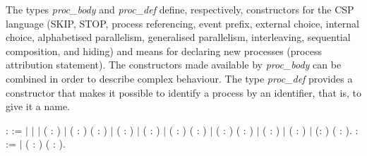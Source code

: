 The types \emph{proc\_body} and \emph{proc\_def} define, respectively, constructors for the CSP language (SKIP, STOP, process referencing, event prefix, external choice, internal choice, alphabetised parallelism, generalised parallelism, interleaving, sequential composition, and hiding) and means for declaring new processes (process attribution statement). The constructors made available by \emph{proc\_body} can be combined in order to describe complex behaviour. The type \emph{proc\_def} provides a constructor that makes it possible to identify a process by an identifier, that is, to give it a name.

\begin{coqdoccode}
	\coqdocnoindent
	  :  :=\coqdoceol
	\coqdocindent{1.00em}
	\ensuremath{|} \coqdoceol
	\coqdocindent{1.00em}
	\ensuremath{|} \coqdoceol
	\coqdocindent{1.00em}
	\ensuremath{|}  ( : )\coqdoceol
	\coqdocindent{1.00em}
	\ensuremath{|}  ( : ) ( : )\coqdoceol
	\coqdocindent{1.00em}
	\ensuremath{|}  (  : )\coqdoceol
	\coqdocindent{1.00em}
	\ensuremath{|}  (  : )\coqdoceol
	\coqdocindent{1.00em}
	\ensuremath{|}  (  : ) (  : )\coqdoceol
	\coqdocindent{1.00em}
	\ensuremath{|}  (  : ) ( : )\coqdoceol
	\coqdocindent{1.00em}
	\ensuremath{|}  (  : )\coqdoceol
	\coqdocindent{1.00em}
	\ensuremath{|}  (  : )\coqdoceol
	\coqdocindent{1.00em}
	\ensuremath{|}  (: ) ( : ).\coqdoceol
	\coqdocnoindent
	  :  :=\coqdoceol
	\coqdocindent{1.00em}
	\ensuremath{|}  ( : ) ( : ).\coqdoceol
\end{coqdoccode}


